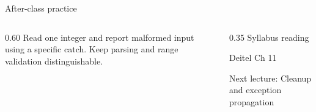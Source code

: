 \documentclass[10pt,aspectratio=169]{beamer}
\begin{document}
\begin{frame}[fragile,t]{After-class practice}
\begin{columns}[T,onlytextwidth]\begin{column}{0.60\textwidth}
Read one integer and report malformed input using a specific catch. Keep parsing and range validation distinguishable.
\end{column}\begin{column}{0.35\textwidth}\small
Syllabus reading\par Deitel Ch 11

Next lecture: Cleanup and exception propagation
\end{column}\end{columns}
\end{frame}
\end{document}
